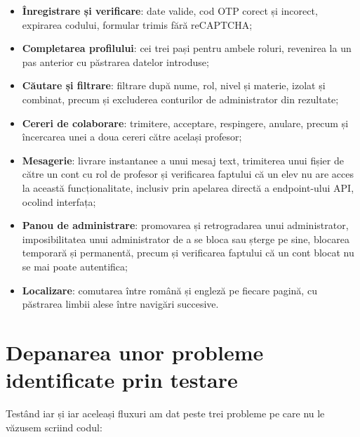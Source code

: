 \begin{itemize}
    \item \textbf{Înregistrare și verificare}: date valide, cod OTP corect și
    incorect, expirarea codului, formular trimis fără reCAPTCHA;
    \item \textbf{Completarea profilului}: cei trei pași pentru ambele roluri,
    revenirea la un pas anterior cu păstrarea datelor introduse;
    \item \textbf{Căutare și filtrare}: filtrare după nume, rol, nivel și materie,
    izolat și combinat, precum și excluderea conturilor de administrator din
    rezultate;
    \item \textbf{Cereri de colaborare}: trimitere, acceptare, respingere, anulare,
    precum și încercarea unei a doua cereri către același profesor;
    \item \textbf{Mesagerie}: livrare instantanee a unui mesaj text, trimiterea
    unui fișier de către un cont cu rol de profesor și verificarea faptului că
    un elev nu are acces la această funcționalitate, inclusiv prin apelarea
    directă a endpoint-ului API, ocolind interfața;
    \item \textbf{Panou de administrare}: promovarea și retrogradarea unui
    administrator, imposibilitatea unui administrator de a se bloca sau șterge
    pe sine, blocarea temporară și permanentă, precum și verificarea faptului că
    un cont blocat nu se mai poate autentifica;
    \item \textbf{Localizare}: comutarea între română și engleză pe fiecare
    pagină, cu păstrarea limbii alese între navigări succesive.
\end{itemize}

\section{Depanarea unor probleme identificate prin testare}

Testând iar și iar aceleași fluxuri am dat peste trei probleme pe care nu le
văzusem scriind codul:

